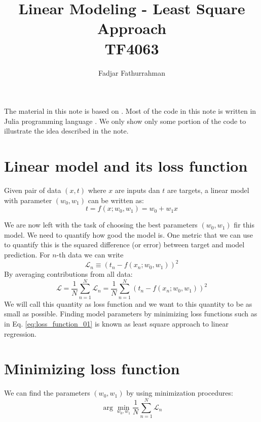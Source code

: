 \documentclass[a4paper,11pt]{article} %
\newcommand{\highlight}[1]{\colorbox{red!25}{#1}}
\begin{document}
\title{Linear Modeling - Least Square Approach\\
TF4063}
\author{Fadjar Fathurrahman}
\date{}
\maketitle

The material in this note is based on \cite{Rogers2017}.
Most of the code in this note is written in Julia programming language
\cite{Bezanson2017,juliaorg}.
We only show only some portion of the code to illustrate the idea described in the
note.

\section{Linear model and its loss function}

Given pair of data $(x,t)$ where $x$ are inputs dan $t$
are targets, a linear model with parameter $(w_0, w_1)$ can
be written as:
\begin{equation}
t = f(x; w_0, w_1) = w_0 + w_1 x
\label{eq:model_linear_01}
\end{equation}

We are now left with the task of choosing the best parameters $(w_0, w_1)$
fir this model.
We need to quantify how good the model is.
One metric that we can use to quantify this is the squared difference (or
error) between target and model prediction. For $n$-th data we can write
\begin{equation}
\mathcal{L}_n \equiv \left( t_n - f(x_n; w_0, w_1) \right)^2
\end{equation}
%
By averaging contributions from all data:
\begin{equation}
\mathcal{L} = \frac{1}{N} \sum_{n=1}^{N} \mathcal{L}_n =
\frac{1}{N} \sum_{n=1}^{N} \left( t_n - f(x_n; w_0, w_1) \right)^2
\label{eq:loss_function_01}
\end{equation}
We will call this quantity as \highlight{loss function}
and we want to this quantity to be as small as possible.
Finding model parameters by minimizing loss functions such as in Eq. \eqref{eq:loss_function_01}
is known as least square approach to linear regression.


\section{Minimizing loss function}

We can find the parameters $(w_{0},w_{1})$ by using minimization procedures:
\begin{equation}
\arg\min_{w_{0},w_{1}} \frac{1}{N} \sum_{n=1}^{N} \mathcal{L}_{n}
\end{equation}
\end{document}
